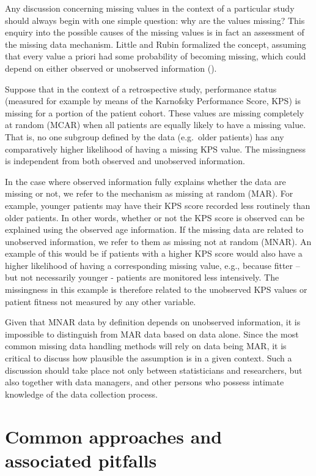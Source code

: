 \documentclass[
  letterpaper,
  paper=240mm:170mm,
  twoside=true,
  open=right,
  fontsize=10pt,
  pagesize=false,
  BCOR=15mm,
  DIV=14,
  headinclude=true,
  footinclude=false,
  headsepline=on]{scrbook}
\begin{document}
Any discussion concerning missing values in the context of a particular
study should always begin with one simple question: why are the values
missing? This enquiry into the possible causes of the missing values is
in fact an assessment of the missing data mechanism. Little and Rubin
formalized the concept, assuming that every value a priori had some
probability of becoming missing, which could depend on either observed
or unobserved information
().

Suppose that in the context of a retrospective study, performance status
(measured for example by means of the Karnofsky Performance Score, KPS)
is missing for a portion of the patient cohort. These values are missing
completely at random (MCAR) when all patients are equally likely to have
a missing value. That is, no one subgroup defined by the data
(e.g.~older patients) has any comparatively higher likelihood of having
a missing KPS value. The missingness is independent from both observed
and unobserved information.

In the case where observed information fully explains whether the data
are missing or not, we refer to the mechanism as missing at random
(MAR). For example, younger patients may have their KPS score recorded
less routinely than older patients. In other words, whether or not the
KPS score is observed can be explained using the observed age
information. If the missing data are related to unobserved information,
we refer to them as missing not at random (MNAR). An example of this
would be if patients with a higher KPS score would also have a higher
likelihood of having a corresponding missing value, e.g., because fitter
-- but not necessarily younger - patients are monitored less
intensively. The missingness in this example is therefore related to the
unobserved KPS values or patient fitness not measured by any other
variable.

Given that MNAR data by definition depends on unobserved information, it
is impossible to distinguish from MAR data based on data alone. Since
the most common missing data handling methods will rely on data being
MAR, it is critical to discuss how plausible the assumption is in a
given context. Such a discussion should take place not only between
statisticians and researchers, but also together with data managers, and
other persons who possess intimate knowledge of the data collection
process.

\section{Common approaches and associated
pitfalls}\label{common-approaches-and-associated-pitfalls}
\end{document}
